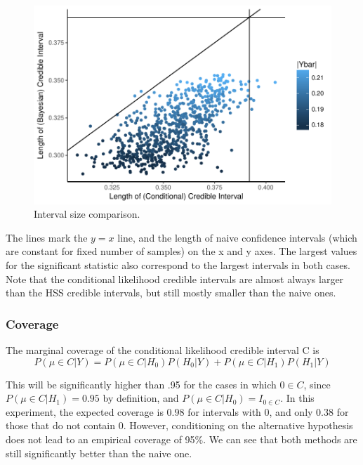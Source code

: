 \documentclass[AMA,STIX1COL]{WileyNJD-v2}\usepackage[]{graphicx}\usepackage[]{color}
\newenvironment{knitrout}{}{} %
\begin{document}
\begin{figure}
\caption{Interval size comparison.}

\begin{knitrout}
\color{fgcolor}

{\centering \includegraphics[width=6in]{figure/unnamed-chunk-8-1} 

}



\end{knitrout}

\end{figure}

The lines mark the $y = x$ line, and the length of naive confidence intervals (which are constant for fixed number of samples) on the x and y axes. The largest values for the significant statistic also correspond to the largest intervals in both cases. Note that the conditional likelihood credible intervals are almost always larger than the HSS credible intervals, but still mostly smaller than the naive ones. 

\subsubsection{Coverage}


The marginal coverage of the conditional likelihood credible interval C is 
\begin{equation}
P(\mu \in C|Y) = P(\mu \in C|H_0) P(H_0|Y)+P(\mu \in C|H_1) P(H_1|Y)
\end{equation}

This will be significantly higher than .95 for the cases in which $0 \in C$, since $P(\mu \in C|H_1) =0.95$ by definition, and  $P(\mu \in C|H_0) = I_{0 \in C}$. In this experiment, the expected coverage is $0.98$ for intervals with 0, and only $0.38$ for those that do not contain 0.  However, conditioning on the alternative hypothesis does not lead to an empirical coverage of 95\%. We can see that both methods are still significantly better than the naive one.
\end{document}

